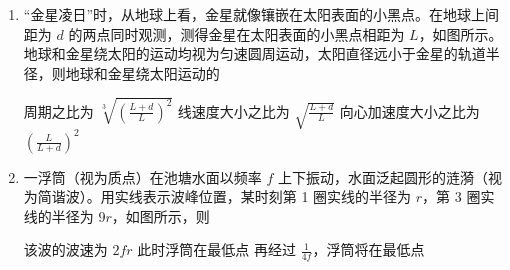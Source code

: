 \documentclass[\gkver]{gaokaozhenti}
\begin{document}
\begin{enumerate}
{故选 C。
}

\item
“金星凌日”时，从地球上看，金星就像镶嵌在太阳表面的小黑点。在地球上间距为 $d$ 的两点同时观测，测得金星在太阳表面的小黑点相距为 $L$，如图所示。地球和金星绕太阳的运动均视为匀速圆周运动，太阳直径远小于金星的轨道半径，则地球和金星绕太阳运动的

\onepicture[h=4.60cm]{}

{周期之比为 $\sqrt[3]{\left(\frac{L+d}{L}\right)^{2}}$}
{线速度大小之比为 $\sqrt{\frac{L+d}{L}}$}
{向心加速度大小之比为 $\left(\frac{L}{L+d}\right)^{2}$}


\item
一浮筒（视为质点）在池塘水面以频率 $f$ 上下振动，水面泛起圆形的涟漪（视为简谐波）。用实线表示波峰位置，某时刻第 1 圈实线的半径为 $r$，第 3 圈实线的半径为 $9r$，如图所示，则

\onepicture[w=5.58cm]{}

{该波的波速为 $2fr$}
{此时浮筒在最低点}
{再经过 $\frac{1}{4f}$，浮筒将在最低点}


\end{enumerate}
\end{document}
